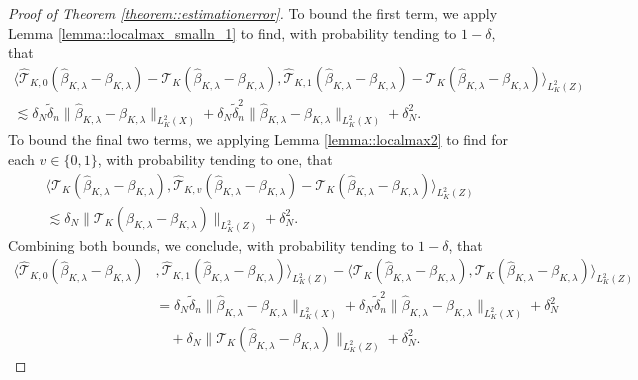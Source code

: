 \documentclass[11pt]{article}
\theoremstyle{plain}
\theoremstyle{definition}
\theoremstyle{remark}
\theoremstyle{definition}
\begin{document}
\begin{proof}[Proof of Theorem \ref{theorem::estimationerror}]
To bound the first term, we apply Lemma \ref{lemma::localmax_smalln_1} to find, with probability tending to $1 - \delta$, that
\begin{align*}
     \langle  \widehat{\mathcal{T}}_{K,0}(\widehat{\beta}_{K,\lambda} - \beta_{K,\lambda}) - \mathcal{T}_{K}(\widehat{\beta}_{K,\lambda} - \beta_{K,\lambda}), \widehat{\mathcal{T}}_{K,1}(\widehat{\beta}_{K,\lambda} - \beta_{K,\lambda}) - \mathcal{T}_{K}(\widehat{\beta}_{K,\lambda} - \beta_{K,\lambda})\rangle_{L^2_K(Z)} \\
     \lesssim \delta_N \widetilde{\delta}_n  \|\widehat{\beta}_{K,\lambda} - \beta_{K,\lambda}\|_{L^2_K(X)}   +   \delta_N \widetilde{\delta}_n^2  \|\widehat{\beta}_{K,\lambda} - \beta_{K,\lambda}\|_{L^2_K(X)}   + \delta_N^2 .
\end{align*}
To bound the final two terms, we applying Lemma \ref{lemma::localmax2} to find for each $v \in \{0,1\}$, with probability tending to one, that
\begin{align*}
     \langle  \mathcal{T}_{K}(\widehat{\beta}_{K,\lambda} - \beta_{K,\lambda}), \widehat{\mathcal{T}}_{K,v}(\widehat{\beta}_{K,\lambda} - \beta_{K,\lambda}) - \mathcal{T}_{K}(\widehat{\beta}_{K,\lambda} - \beta_{K,\lambda})\rangle_{L^2_K(Z)} \\
     \lesssim    \delta_N   \|\mathcal{T}_{K}(\widehat{\beta}_{K,\lambda} - \beta_{K,\lambda})\|_{L^2_K(Z)} + \delta_N^2 .
\end{align*}
Combining both bounds, we conclude, with probability tending to $1 - \delta$, that
 \begin{align*}
    \langle  \widehat{\mathcal{T}}_{K,0}(\widehat{\beta}_{K,\lambda} - \beta_{K,\lambda})&, \widehat{\mathcal{T}}_{K,1}(\widehat{\beta}_{K,\lambda} - \beta_{K,\lambda}) \rangle_{L^2_K(Z)} -  \langle  \mathcal{T}_{K}(\widehat{\beta}_{K,\lambda} - \beta_{K,\lambda}), \mathcal{T}_{K}(\widehat{\beta}_{K,\lambda} - \beta_{K,\lambda}) \rangle_{L^2_K(Z)}\\
    & =  \delta_N \widetilde{\delta}_n  \|\widehat{\beta}_{K,\lambda} - \beta_{K,\lambda}\|_{L^2_K(X)}   +   \delta_N \widetilde{\delta}_n^2  \|\widehat{\beta}_{K,\lambda} - \beta_{K,\lambda}\|_{L^2_K(X)}   + \delta_N^2 \\
    & \quad +   \delta_N   \|\mathcal{T}_{K}(\widehat{\beta}_{K,\lambda} - \beta_{K,\lambda})\|_{L^2_K(Z)} + \delta_N^2.
\end{align*}



\end{proof}
\end{document}
